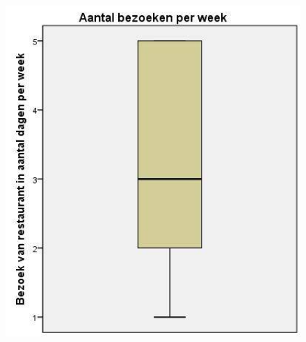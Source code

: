 \documentclass{beamer}
\begin{document}
\begin{frame}
\begin{columns}
\begin{column}{0.5\textwidth}
        \begin{figure}
          \centering
          \includegraphics[width=1.00\textwidth]{img/boxplotStudenten.jpg}
          \label{fig:boxplotStudenten}
        \end{figure}

      \end{column}
    \end{columns}
  \end{frame}
\end{document}
